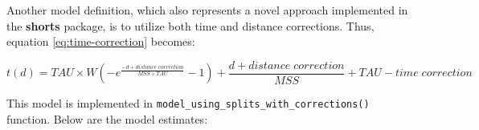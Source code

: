 \documentclass[fleqn,10pt]{wlpeerj} %
\newenvironment{Shaded}{\begin{snugshade}}{\end{snugshade}}
\newcommand{\AttributeTok}[1]{\textcolor[rgb]{0.77,0.63,0.00}{#1}}
\newcommand{\ConstantTok}[1]{\textcolor[rgb]{0.00,0.00,0.00}{#1}}
\newcommand{\DecValTok}[1]{\textcolor[rgb]{0.00,0.00,0.81}{#1}}
\newcommand{\FunctionTok}[1]{\textcolor[rgb]{0.00,0.00,0.00}{#1}}
\newcommand{\NormalTok}[1]{#1}
\newcommand{\OtherTok}[1]{\textcolor[rgb]{0.56,0.35,0.01}{#1}}
\newcommand{\SpecialCharTok}[1]{\textcolor[rgb]{0.00,0.00,0.00}{#1}}
\newcommand{\StringTok}[1]{\textcolor[rgb]{0.31,0.60,0.02}{#1}}
\begin{document}
\normalsize

Another model definition, which also represents a novel approach implemented in the \textbf{shorts} package, is to utilize both time and distance corrections. Thus, equation \eqref{eq:time-correction} becomes:

\begin{equation}
  t(d) = TAU \times W(-e^{\frac{-d + distance \; correction}{MSS \times TAU}} - 1) + \frac{d + distance \; correction}{MSS} + TAU - time \; correction \label{eq:time-distance-correction}
\end{equation}

This model is implemented in \texttt{model\_using\_splits\_with\_corrections()} function. Below are the model estimates:

\small

\begin{Shaded}
\end{Shaded}
\end{document}

